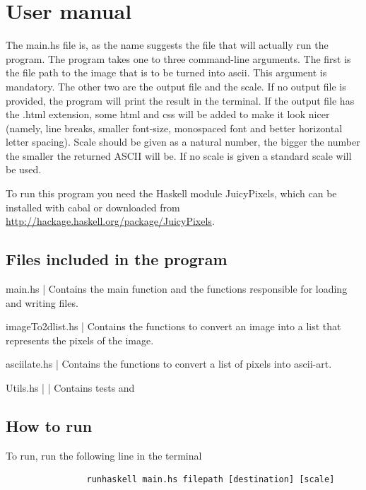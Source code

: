 \documentclass[12pt, a4paper]{article}
\begin{document}
	\section{User manual}

	The main.hs file is, as the name suggests the file that will actually run the program. The program takes one to three command-line arguments. The first is the file path to the image that is to be turned into ascii. This argument is mandatory. The other two are the output file and the scale. If no output file is provided, the program will print the result in the terminal. If the output file has the .html extension, some html and css will be added to make it look nicer (namely, line breaks, smaller font-size, monospaced font and better horizontal letter spacing). Scale should be given as a natural number, the bigger the number the smaller the returned ASCII will be. If no scale is given a standard scale will be used.

	To run this program you need the Haskell module JuicyPixels, which can be installed with cabal or downloaded from \url{http://hackage.haskell.org/package/JuicyPixels}. 
		
		

	
		\subsection{Files included in the program }
		
		main.hs | Contains the main function and the functions responsible for loading and writing files.

		imageTo2dlist.hs | Contains the functions to convert an image into a list that represents the pixels of the image.

		asciilate.hs | Contains the functions to convert a list of pixels into ascii-art.

		Utils.hs | | Contains tests and 
			
		\subsection{How to run}

		To run, run the following line in the terminal
		\begin{footnotesize}
			\begin{verbatim}
				runhaskell main.hs filepath [destination] [scale]
			\end{verbatim}
		\end{footnotesize} 
		
\end{document}
